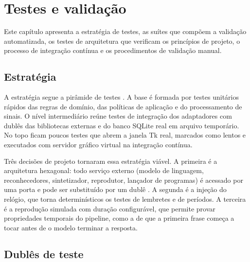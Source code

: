 \chapter{Testes e validação}

Este capítulo apresenta a estratégia de testes, as suítes que compõem a validação automatizada, os
testes de arquitetura que verificam os princípios de projeto, o processo de integração contínua e os
procedimentos de validação manual.

\section{Estratégia}

A estratégia segue a pirâmide de testes \cite{cohn2009}. A base é formada por testes unitários rápidos
das regras de domínio, das políticas de aplicação e do processamento de sinais. O nível intermediário
reúne testes de integração dos adaptadores com dublês das bibliotecas externas e do banco SQLite real
em arquivo temporário. No topo ficam poucos testes que abrem a janela Tk real, marcados como lentos e
executados com servidor gráfico virtual na integração contínua.

Três decisões de projeto tornaram essa estratégia viável. A primeira é a arquitetura hexagonal: todo
serviço externo (modelo de linguagem, reconhecedores, sintetizador, reprodutor, lançador de programas)
é acessado por uma porta e pode ser substituído por um dublê \cite{meszaros2007}. A segunda é a injeção
do relógio, que torna determinísticos os testes de lembretes e de períodos. A terceira é a
reprodução simulada com duração configurável, que permite provar propriedades temporais do pipeline,
como a de que a primeira frase começa a tocar antes de o modelo terminar a resposta.

\section{Dublês de teste}

